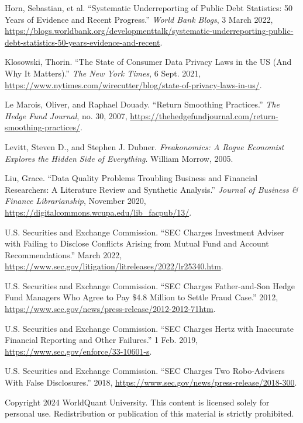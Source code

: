 Horn, Sebastian, et al. ``Systematic Underreporting of Public Debt Statistics: 50 Years of Evidence and Recent Progress.'' \emph{World Bank Blogs}, 3 March 2022, \url{https://blogs.worldbank.org/developmenttalk/systematic-underreporting-public-debt-statistics-50-years-evidence-and-recent}.

Klosowski, Thorin. ``The State of Consumer Data Privacy Laws in the US (And Why It Matters).'' \emph{The New York Times}, 6 Sept. 2021, \url{https://www.nytimes.com/wirecutter/blog/state-of-privacy-laws-in-us/}.

Le Marois, Oliver, and Raphael Douady. ``Return Smoothing Practices.'' \emph{The Hedge Fund Journal}, no. 30, 2007, \url{https://thehedgefundjournal.com/return-smoothing-practices/}.

Levitt, Steven D., and Stephen J. Dubner. \emph{Freakonomics: A Rogue Economist Explores the Hidden Side of Everything}. William Morrow, 2005.

Liu, Grace. ``Data Quality Problems Troubling Business and Financial Researchers: A Literature Review and Synthetic Analysis.'' \emph{Journal of Business \& Finance Librarianship}, November 2020, \url{https://digitalcommons.wcupa.edu/lib_facpub/13/}.

U.S. Securities and Exchange Commission. ``SEC Charges Investment Adviser with Failing to Disclose Conflicts Arising from Mutual Fund and Account Recommendations.'' March 2022, \url{https://www.sec.gov/litigation/litreleases/2022/lr25340.htm}.

U.S. Securities and Exchange Commission. ``SEC Charges Father-and-Son Hedge Fund Managers Who Agree to Pay \$4.8 Million to Settle Fraud Case.'' 2012, \url{https://www.sec.gov/news/press-release/2012-2012-71htm}.

U.S. Securities and Exchange Commission. ``SEC Charges Hertz with Inaccurate Financial Reporting and Other Failures.'' 1 Feb. 2019, \url{https://www.sec.gov/enforce/33-10601-s}.

U.S. Securities and Exchange Commission. ``SEC Charges Two Robo-Advisers With False Disclosures.'' 2018, \url{https://www.sec.gov/news/press-release/2018-300}.

Copyright 2024 WorldQuant University. This content is licensed solely for personal use. Redistribution or publication of this material is strictly prohibited.
